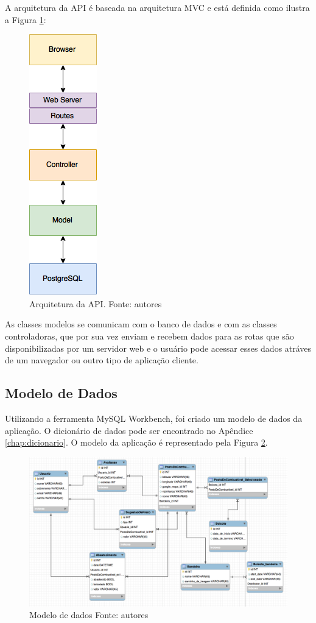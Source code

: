 A arquitetura da API é baseada na arquitetura MVC e está definida como ilustra a Figura \ref{img:arquitetura}:

\begin{figure}[H]
    \centering
    \includegraphics[scale=0.5]{figuras/api_arch.png}
    \caption[Arquitetura da API]{Arquitetura da API. Fonte: autores}
    \label{img:arquitetura}
\end{figure}

As classes modelos se comunicam com o banco de dados e com as classes controladoras, que por sua vez enviam e recebem dados para as rotas que são disponibilizadas por um servidor web e o usuário pode acessar esses dados atráves de um navegador ou outro tipo de aplicação cliente.

\subsection{Modelo de Dados}

Utilizando a ferramenta MySQL Workbench, foi criado um modelo de dados da aplicação. O dicionário de dados pode ser encontrado no Apêndice \ref{chap:dicionario}. O modelo da aplicação é representado pela Figura \ref{img:modelo_de_dados}.

\begin{figure}[H]
    \centering
    \includegraphics[scale=0.5]{figuras/modelagem_traduzida.png}
    \caption[Modelo de dados]{Modelo de dados Fonte: autores}
    \label{img:modelo_de_dados}
\end{figure}

